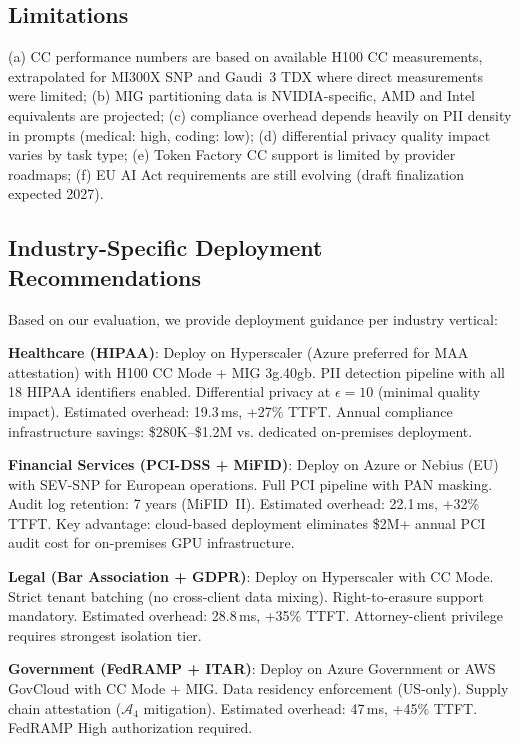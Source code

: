 \documentclass[conference,10pt]{IEEEtran}
\begin{document}
\subsection{Limitations}

(a) CC performance numbers are based on available H100 CC measurements, extrapolated for MI300X SNP and Gaudi~3 TDX where direct measurements were limited; (b) MIG partitioning data is NVIDIA-specific, AMD and Intel equivalents are projected; (c) compliance overhead depends heavily on PII density in prompts (medical: high, coding: low); (d) differential privacy quality impact varies by task type; (e) Token Factory CC support is limited by provider roadmaps; (f) EU AI Act requirements are still evolving (draft finalization expected 2027).

\subsection{Industry-Specific Deployment Recommendations}

Based on our evaluation, we provide deployment guidance per industry vertical:

\textbf{Healthcare (HIPAA)}: Deploy on Hyperscaler (Azure preferred for MAA attestation) with H100 CC Mode + MIG 3g.40gb. PII detection pipeline with all 18 HIPAA identifiers enabled. Differential privacy at $\epsilon=10$ (minimal quality impact). Estimated overhead: 19.3\,ms, +27\% TTFT. Annual compliance infrastructure savings: \$280K--\$1.2M vs. dedicated on-premises deployment.

\textbf{Financial Services (PCI-DSS + MiFID)}: Deploy on Azure or Nebius (EU) with SEV-SNP for European operations. Full PCI pipeline with PAN masking. Audit log retention: 7 years (MiFID~II). Estimated overhead: 22.1\,ms, +32\% TTFT. Key advantage: cloud-based deployment eliminates \$2M+ annual PCI audit cost for on-premises GPU infrastructure.

\textbf{Legal (Bar Association + GDPR)}: Deploy on Hyperscaler with CC Mode. Strict tenant batching (no cross-client data mixing). Right-to-erasure support mandatory. Estimated overhead: 28.8\,ms, +35\% TTFT. Attorney-client privilege requires strongest isolation tier.

\textbf{Government (FedRAMP + ITAR)}: Deploy on Azure Government or AWS GovCloud with CC Mode + MIG. Data residency enforcement (US-only). Supply chain attestation ($\mathcal{A}_4$ mitigation). Estimated overhead: 47\,ms, +45\% TTFT. FedRAMP High authorization required.
\end{document}

